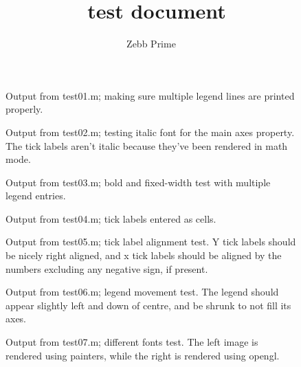 \documentclass[a4paper,11pt]{article}
\title{\matlabfrag\ test document}
\author{Zebb Prime}
\begin{document}
  \maketitle
     \begin{figure}[ht]
       \centering
       \caption{Output from {\ttfamily test01.m}; making sure multiple legend lines are printed properly.}
     \end{figure}
     \begin{figure}[ht]
       \centering
       \caption{Output from {\ttfamily test02.m}; testing italic font for the main axes property. The
       tick labels aren't italic because they've been rendered in math mode.}
     \end{figure}
     \begin{figure}[ht]
       \centering
       \caption{Output from {\ttfamily test03.m}; bold and fixed-width test with multiple legend entries.}
     \end{figure}
     \begin{figure}[ht]
       \centering
       \caption{Output from {\ttfamily test04.m}; tick labels entered as cells.}
     \end{figure}
     \begin{figure}[ht]
       \centering
       \caption{Output from {\ttfamily test05.m}; tick label alignment test. Y tick labels should be
       nicely right aligned, and x tick labels should be aligned by the numbers excluding any negative
       sign, if present.}
     \end{figure}
     \begin{figure}[ht]
       \centering
       \caption{Output from {\ttfamily test06.m}; legend movement test. The legend should appear slightly
         left and down of centre, and be shrunk to not fill its axes.}
     \end{figure}
     \begin{figure}[ht]
       \centering
       \quad
       \caption{Output from {\ttfamily test07.m}; different fonts test. The left image is rendered using
       painters, while the right is rendered using opengl.}
     \end{figure}
\end{document}
